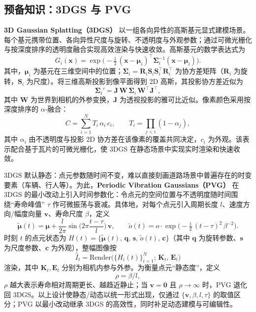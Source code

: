 \documentclass[10pt,conference]{IEEEtran} %
\begin{document}
\subsection{预备知识：3DGS 与 PVG}
\textbf{3D Gaussian Splatting（3DGS）} 以一组各向异性的高斯基元显式建模场景。每个基元携带位置、各向异性尺度与旋转、不透明度与外观参数；通过可微光栅化与按深度排序的透明度融合实现高效渲染与快速收敛。高斯基元的数学表达式为
\begin{equation}
G_i(\bm{x})=\exp\!\Big(-\tfrac{1}{2}\,(\bm{x}-\bm{\mu}_i)^\top \bm{\Sigma}_i^{-1}(\bm{x}-\bm{\mu}_i)\Big).
\end{equation}
其中，$\bm{\mu}_i$ 为基元在三维空间中的位置；$\bm{\Sigma}_i=\mathbf{R}_i\mathbf{S}_i\mathbf{S}_i^\top\mathbf{R}_i^\top$ 为协方差矩阵（$\mathbf{R}_i$ 为旋转，$\mathbf{S}_i$ 为尺度）。将三维高斯投影到像平面得到 2D 高斯，其投影协方差近似为
\begin{equation}
\bm{\Sigma}_i'=\mathbf{J}\,\mathbf{W}\,\bm{\Sigma}_i\,\mathbf{W}^\top\mathbf{J}^\top,
\end{equation}
其中 $\mathbf{W}$ 为世界到相机的外参变换，$\mathbf{J}$ 为透视投影的雅可比近似。像素颜色采用按深度排序的 $\alpha$-融合：
\begin{equation}
C=\sum_{i=1}^{N} T_i\,\alpha_i\,c_i,\qquad 
T_i=\prod_{j<i}(1-\alpha_j),
\end{equation}
其中 $\alpha_i$ 由不透明度与投影 2D 协方差在该像素的覆盖共同决定，$c_i$ 为外观。该表示配合基于瓦片的可微光栅化，使 3DGS 在静态场景中实现实时渲染和快速收敛。

3DGS 默认静态：点元参数随时间不变，难以直接刻画道路场景中普遍存在的时变要素（车辆、行人等）。为此，\textbf{Periodic Vibration Gaussians（PVG）} 在 3DGS 的最小改动上引入时间参数化：令点元的空间位置与不透明度随时间围绕“寿命峰值” $\tau$ 作可微振荡与衰减。具体地，对每个点元引入周期长度 $l$、速度方向/幅度向量 $\bm{v}$、寿命尺度 $\beta$，定义
\begin{equation}
\tilde{\bm{\mu}}(t)=\bm{\mu}+\frac{l}{2\pi}\sin\!\Big(2\pi\frac{t-\tau}{l}\Big)\,\bm{v},\qquad
\tilde o(t)=o\cdot \exp\!\Big(-\tfrac12\,(t-\tau)^2\,\beta^{-2}\Big).
\end{equation}
时刻 $t$ 的点元状态为 $H(t)=\{\tilde{\bm{\mu}}(t),\,\mathbf{q},\,\mathbf{s},\,\tilde o(t),\,\mathbf{c}\}$（其中 $\mathbf{q}$ 为旋转参数、$\mathbf{s}$ 为尺度参数、$\mathbf{c}$ 为外观），整幅图像按
\begin{equation}
\hat I_t=\mathrm{Render}\big(\{H_i(t)\}_{i=1}^{N};\,\mathbf{K}_t,\,\mathbf{E}_t\big)
\end{equation}
渲染，其中 $\mathbf{K}_t,\mathbf{E}_t$ 分别为相机内参与外参。为衡量点元“静态度”，定义
\begin{equation}
\rho=\beta/l,
\end{equation}
$\rho$ 越大表示寿命相对周期更长、越趋近静止；当 $\bm{v}=\bm{0}$ 且 $\rho\to\infty$ 时，PVG 退化回 3DGS。以上设计使静态/动态以统一形式出现，仅通过 $\{\bm{v},\beta,l,\tau\}$ 的取值区分；PVG 以最小改动继承 3DGS 的高效性，同时补足动态建模与可编辑性。
\end{document}
